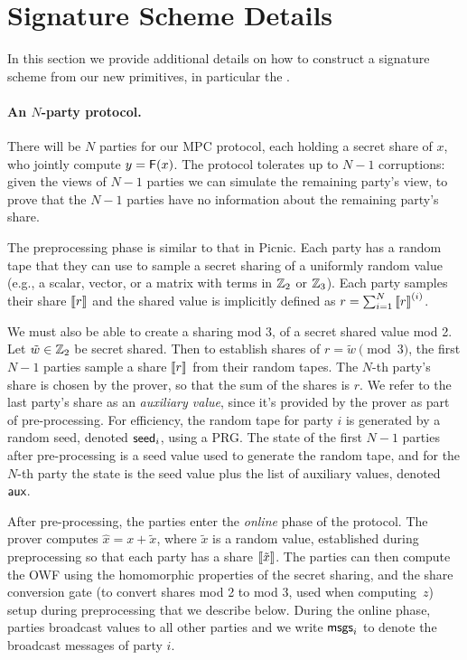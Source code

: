 \section{Signature Scheme Details}
\label{appendix:picnic}
In this section we provide additional details on how to construct a signature scheme from our
new primitives, in particular the \ttOWF.


\paragraph{An $N$-party protocol.}
There will be $N$ parties for our MPC protocol, each holding a secret share of
$x$, who jointly compute $y = \mathsf{F}(x)$.  The protocol tolerates up to  $N-1$ 
corruptions: given the views of $N-1$ parties we can simulate the remaining
party's view, to prove that the $N-1$ parties have no information about the
remaining party's share. 

The preprocessing phase is similar to that in Picnic.  Each party has a random
tape that they can use to sample a secret sharing of a uniformly random value
(e.g.,  a scalar, vector, or a matrix with terms in $\mathbb{Z}_2$ or $\mathbb{Z}_3$).  Each
party samples their share $\left\llbracket r \right\rrbracket$ and the shared value is implicitly defined as
$r = \sum_{i=1}^N \left\llbracket r \right\rrbracket^{(i)}$.  

We must also be able to create a sharing mod 3, of a secret shared value mod 2.
Let $\tilde{w}\in\mathbb{Z}_2$ be secret shared.  Then to establish shares of $r = \tilde{w} \pmod
3$, the first $N-1$ parties sample a share $\left\llbracket r \right\rrbracket$ from their random tapes. The
$N$-th party's share is chosen by the prover, so that the sum of the shares is
$r$.  We refer to the last party's share as an \emph{auxiliary value}, since
it's provided by the prover as part of pre-processing.  For efficiency, the random
tape for  party $i$ is
generated by a random seed, denoted $\textsf{seed}_i$, using a PRG. The state of the first
$N-1$ parties after pre-processing is a seed value used to generate the random
tape, and for the $N$-th party the state is the seed value plus the list of
auxiliary values, denoted $\textsf{aux}$. 

After pre-processing, the parties enter the \emph{online} phase of the protocol. 
The prover computes $\hat{x}= x + \tilde{x}$, where $\tilde{x}$ is a random value, established during
preprocessing so that each party has a share $\left\llbracket \tilde{x} \right\rrbracket$. 
The parties can then compute the OWF using the homomorphic properties of the secret sharing, 
and the share conversion gate (to convert shares mod 2 to mod 3, used when computing~$z$)
setup during preprocessing that we describe below. 
During the online phase, parties broadcast values to all other parties and we write $\textsf{msgs}_i$
to denote the broadcast messages of party $i$. 


